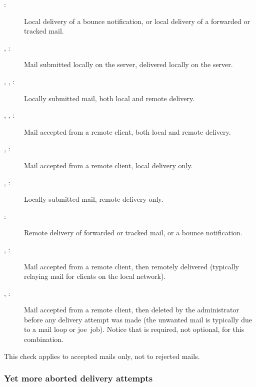 \begin{description}

    \item [:] Local delivery of a bounce notification, or
        local delivery of a forwarded or tracked mail.

    \item [, :] Mail submitted locally on the
        server, delivered locally on the server.

    \item [, , :] Locally
        submitted mail, \newline both local and remote delivery.

    \item [, , :] Mail accepted
        from a remote client, both local and remote delivery.

    \item [, :] Mail accepted from a remote
        client, local delivery only.

    \item [, :] Locally submitted mail, remote
        delivery only.

    \item [:] Remote delivery of forwarded or tracked mail, or
        a bounce notification.

    \item [, :] Mail accepted from a remote
        client, then remotely delivered (typically relaying mail for
        clients on the local network).

    \item [, :] Mail accepted from a remote
        client, then deleted by the administrator before any delivery
        attempt was made (the unwanted mail is typically due to a mail loop
        or joe~job).  Notice that  is required, not
        optional, for this combination.

\end{description}

This check applies to accepted mails only, not to rejected mails.

\subsubsection{Yet more aborted delivery attempts}

